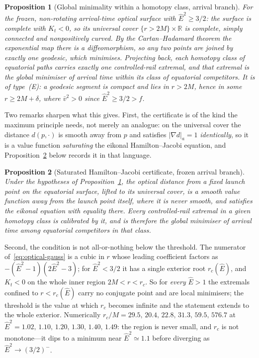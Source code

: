 \documentclass[12pt]{iopart}
\theoremstyle{plain}
\newtheorem{proposition}{Proposition}
\theoremstyle{definition}
\theoremstyle{remark}
\newcommand{\Ehat}{\hat E}
\begin{document}
\begin{proposition}[Global minimality within a homotopy class, arrival branch]
\label{prop:globalmin}
For the frozen, non-rotating \emph{arrival-time} optical surface with
$\Ehat^2\ge3/2$: the surface is complete with $K_t<0$, so its universal cover
$\{r>2M\}\times\mathbb R$ is complete, simply connected and nonpositively
curved. By the Cartan--Hadamard theorem the
exponential map there is a diffeomorphism, so any two points are joined by
exactly one geodesic, which minimises. Projecting back, each homotopy class of
equatorial paths carries \emph{exactly one} controlled-rail extremal, and that
extremal is the \emph{global} minimiser of arrival time within its class of
equatorial competitors. It is of type~(E): a geodesic segment is compact and lies in
$r>2M$, hence in some $r\ge2M+\delta$, where $\bar v^2>0$ since $\Ehat^2\ge3/2>f$.
\end{proposition}

Two remarks sharpen what this gives. First, the certificate is of the kind the
maximum principle needs, not merely an analogue: on the universal cover the
distance $d(p,\cdot)$ is smooth away from $p$ and satisfies
$|\nabla d|_a=1$ \emph{identically}, so it is a value function
\emph{saturating} the eikonal Hamilton--Jacobi equation, and
Proposition~\ref{prop:hjb-frozen} below records it in that language.

\begin{proposition}[Saturated Hamilton--Jacobi certificate, frozen arrival branch]
\label{prop:hjb-frozen}
Under the hypotheses of Proposition~\ref{prop:globalmin}, the optical distance
from a fixed launch point on the equatorial surface, lifted to its universal
cover, is a smooth value function \emph{away from the launch point itself},
where it is never smooth, and satisfies the eikonal equation with equality
there.
Every controlled-rail extremal in a given homotopy class is calibrated by it, and
is therefore the global minimiser of arrival time among equatorial competitors in
that class.
\end{proposition}

Second, the condition is not all-or-nothing below the threshold. The numerator
of~\eqref{eq:optical-gauss} is a cubic in $r$ whose leading coefficient factors
as $-(\Ehat^2-1)(2\Ehat^2-3)$; for $\Ehat^2<3/2$ it has a single exterior root
$r_c(\Ehat)$, and $K_t<0$ on the whole inner region $2M<r<r_c$. So for
\emph{every} $\Ehat>1$ the extremals confined to $r<r_c(\Ehat)$ carry no
conjugate point and are local minimisers; the threshold is the value at which
$r_c$ becomes infinite and the statement extends to the whole exterior.
Numerically $r_c/M=29.5,\,20.4,\,22.8,\,31.3,\,59.5,\,576.7$ at
$\Ehat^2=1.02,\,1.10,\,1.20,\,1.30,\,1.40,\,1.49$: the region is never small, and
$r_c$ is not monotone---it dips to a minimum near $\Ehat^2\simeq1.1$ before
diverging as $\Ehat^2\to(3/2)^-$.
\end{document}
